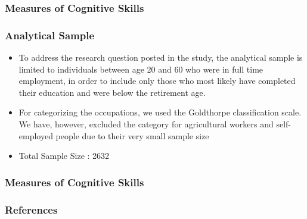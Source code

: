 \documentclass[11pt]{beamer}
\begin{document}
\begin{frame}[t]
	\frametitle{Measures of Cognitive Skills}
	 \begin{itemize}
	\end{itemize}
\end{frame}

\begin{frame}[t]
	\frametitle{Analytical Sample}
	 \begin{itemize}
	 	\item To address the research question posted in the study, the analytical
sample is limited to individuals between age 20 and 60 who were in
full time employment, in order to include only those who most likely
have completed their education and were below the retirement age.

		\item For categorizing the occupations, we used the Goldthorpe
classification scale. We have, however, excluded the category for
agricultural workers and self-employed people due to their very small
sample size

		\item Total Sample Size : 2632
	\end{itemize}
\end{frame}

\begin{frame}[t]
	\frametitle{Measures of Cognitive Skills}
	 \begin{itemize}
	\end{itemize}
\end{frame}


 {
    \begin{frame}
        \frametitle{}
    \end{frame}

}

\begin{frame}[allowframebreaks]
    \frametitle{References}
    
    \renewcommand{\bibfont}{\normalfont\footnotesize}
    \printbibliography
    
    
\end{frame}
\end{document}
